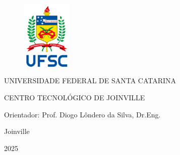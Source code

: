 \singlespacing  %
\pagestyle{empty}  %

\setmainfont{Arial}
\begin{figure}
    \centering
    \includegraphics[width=2.39cm,height=3.3cm]{Logo UFSC/logoUFSC.png}
    \label{fig:elogoUFSC}    
\end{figure}

\begin{center}
    UNIVERSIDADE FEDERAL DE SANTA CATARINA

    CENTRO TECNOLÓGICO DE JOINVILLE  
\end{center}
    \vspace{2\baselineskip}
    
\maketitle

\begin{center}
    Orientador: Prof. Diogo Lôndero da Silva, Dr.Eng.

    \vspace{12\baselineskip}

    Joinville

    2025
    
\end{center}
